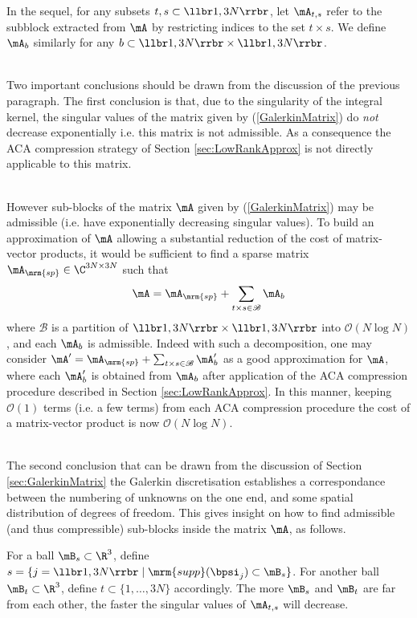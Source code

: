 In the sequel, for any subsets $t,s\subset \llbr1,3N\rrbr$, let $\mA_{t,s}$ refer to the subblock extracted from $\mA$ 
by restricting indices to the set $t\times s$. We define $\mA_{b}$ similarly for any $b\subset \llbr 1,3N\rrbr\times \llbr 1,3N\rrbr$.

\quad\\
Two important conclusions should be drawn from the discussion of the previous paragraph. The first 
conclusion is that, due to the singularity of the integral kernel, the singular values of the matrix given 
by (\ref{GalerkinMatrix}) do \textit{not} decrease exponentially i.e. this matrix is not admissible. 
As a consequence the ACA compression strategy of Section \ref{sec:LowRankApprox} is not directly applicable 
to this matrix. 

\quad\\
However sub-blocks of the matrix $\mA$ given by (\ref{GalerkinMatrix}) may be admissible (i.e. have exponentially 
decreasing singular values). To build an approximation of $\mA$ allowing a substantial reduction of the cost of 
matrix-vector products, it would be sufficient to find a sparse matrix $\mA_{\mrm{sp}}\in \C^{3N\times 3N}$ such that 
$$
\mA = \mA_{\mrm{sp}} + \sum_{t\times s\in \mathscr{B}} \mA_{b}
$$
where $\mathscr{B}$ is a partition of $\llbr 1,3N\rrbr\times \llbr 1,3N\rrbr$ into $\mathcal{O}(N\log N)$, and each 
$\mA_{b}$ is admissible. Indeed with such a decomposition, one may consider $\mA' = \mA_{\mrm{sp}} + \sum_{t\times s\in \mathscr{B}} \mA_{b}'$
as a good approximation for $\mA$, where each $\mA_{b}'$ is obtained from $\mA_{b}$ after application of the ACA compression 
procedure described in Section \ref{sec:LowRankApprox}. In this manner, keeping $\mathcal{O}(1)$ terms (i.e. a few terms) from each 
ACA compression procedure the cost of a matrix-vector product is now $\mathcal{O}(N\log N)$.





\quad\\
The second conclusion that can be drawn from the discussion of Section \ref{sec:GalerkinMatrix}  the Galerkin discretisation establishes 
a correspondance between the numbering of unknowns on the one end, and some spatial distribution of degrees of freedom. This gives insight 
on how to find admissible (and thus compressible) sub-blocks inside the matrix $\mA$, as follows.

For a ball $\mB_{s}\subset \R^{3}$, define $s = \{j = \llbr 1,3N\rrbr\;\vert \;\mrm{supp}(\bpsi_{j})\subset \mB_{s}\}$. 
For another ball $\mB_{t}\subset \R^{3}$, define $t\subset \{ 1,\dots,3N\}$ accordingly.  
The more $\mB_{s}$ and $\mB_{t}$ are far from each other, the faster the singular values of $\mA_{t,s}$ will decrease. 

